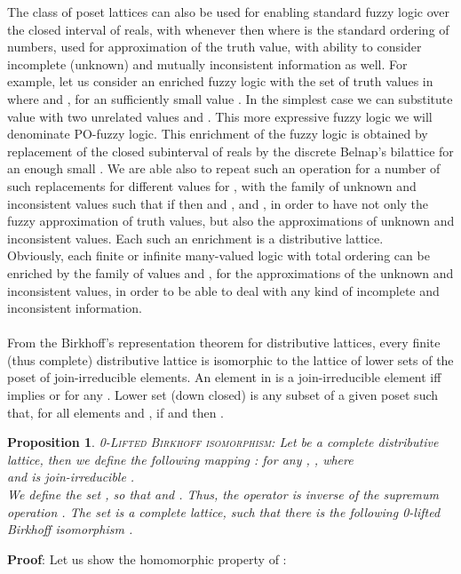 \documentclass[10pt,twocolumn]{article}
\newtheorem{propo}{Proposition}
\begin{document}
The class of poset
lattices can also be used  for enabling standard fuzzy logic over
the closed interval  of reals, with whenever  then
 where  is the standard ordering of numbers,
used for approximation of the truth value, with ability to consider
incomplete (unknown) and mutually inconsistent information as well.
For example, let us consider an enriched fuzzy logic with the set of
truth values in  where  and , for an sufficiently small value . In
the simplest case we can substitute  value with two unrelated
values  and . This more expressive fuzzy
logic we will denominate PO-fuzzy logic. This enrichment of the
fuzzy logic is obtained by replacement of the closed subinterval
 of reals by the discrete Belnap's
bilattice  for an
enough small . We are able also to repeat such an
operation for a number of such replacements for different values for
, with the family of unknown and inconsistent values
such that if  then  and , and , in order
to have not only the fuzzy approximation of truth values, but also
the approximations of unknown and
inconsistent values. Each such an enrichment is a distributive lattice.\\
Obviously, each finite or infinite many-valued logic with total
ordering can be enriched by the family of values  and
,  for the approximations of the unknown and inconsistent
values, in order to be able to deal with any kind of incomplete and
inconsistent information.
\\\\
From the Birkhoff's representation theorem \cite{Birkh40} for
distributive lattices, every finite (thus complete) distributive
lattice is isomorphic to the lattice of lower sets of the poset of
join-irreducible elements. An element  in  is a
join-irreducible element iff  implies  or  for any . Lower set (down closed) is any subset  of
a given poset  such that, for all elements  and
, if  and  then .
\begin{propo} \cite{Birkh40} \textsc{0-Lifted Birkhoff isomorphism:}  \label{def:canisomor}
Let  be a complete distributive lattice, then we define the
following mapping : for any , ,
where \\ and  is
join-irreducible . \\
 We define the set ,  so that   and .  Thus, the
operator  is inverse of the supremum operation
. The set  is a
complete lattice, such that there is the following 0-lifted Birkhoff
isomorphism .
\end{propo}
\textbf{Proof}: Let us show the homomorphic property of
:\\
\end{document}
